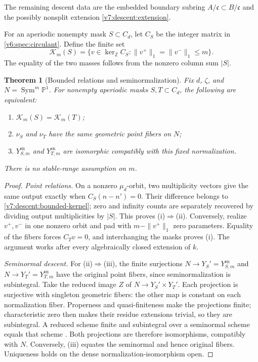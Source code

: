 \documentclass[10pt,fleqn]{article}
\numberwithin{equation}{section}
\newtheorem{theorem}{Theorem}[section]
\newcommand{\PP}{\mathbb P}
\newcommand{\sym}{\operatorname{Sym}}
\begin{document}
The remaining descent data are the embedded boundary subring
$A/\mathfrak c\subset B/\mathfrak c$ and the possibly nonsplit extension
\eqref{v7:descent:extension}.

For an aperiodic nonempty mask $S\subset C_d$, let $C_S$ be the integer
matrix in \eqref{v6:spec:circulant}.  Define the finite set
\begin{equation}\label{v7:descent:bounded-kernel}
 \mathcal K_m(S)=\{v\in\ker_{\mathbb Z}C_S:
       \|v^+\|_1=\|v^-\|_1\le m\}.
\end{equation}
The equality of the two masses follows from the nonzero column sum $|S|$.

\begin{theorem}[Bounded relations and seminormalization]
\label{v7:descent:seminormal-classification}
Fix $d$, $\zeta$, and $N=\sym^m\PP^1$.  For nonempty aperiodic masks
$S,T\subset C_d$, the following are equivalent:
\begin{enumerate}[label=\textup{(\roman*)},leftmargin=2em]
\item $\mathcal K_m(S)=\mathcal K_m(T)$;
\item $\nu_S$ and $\nu_T$ have the same geometric point fibers on $N$;
\item $Y_{S,m}^{\mathrm{sn}}$ and $Y_{T,m}^{\mathrm{sn}}$ are isomorphic
compatibly with this fixed normalization.
\end{enumerate}
There is no stable-range assumption on $m$.
\end{theorem}
\begin{proof}
\emph{Point relations.}
On a nonzero $\mu_d$-orbit, two multiplicity vectors give the same
output exactly when $C_S(n-n')=0$.  Their difference belongs to
\eqref{v7:descent:bounded-kernel}; zero and infinity counts are separately
recovered by dividing output multiplicities by $|S|$.  This proves
(i)$\Rightarrow$(ii).  Conversely, realize $v^+,v^-$ in one nonzero orbit
and pad with $m-\|v^+\|_1$ zero parameters.  Equality of the fibers forces
$C_Tv=0$, and interchanging the masks proves (i).  The argument works
after every algebraically closed extension of $k$.

\emph{Seminormal descent.}
For (ii)$\Rightarrow$(iii), the finite surjections
$N\to Y_S'=Y_{S,m}^{\mathrm{sn}}$ and $N\to Y_T'=Y_{T,m}^{\mathrm{sn}}$
have the original point fibers, since seminormalization is subintegral.
Take the reduced image $Z$ of $N\to Y_S'\times Y_T'$.
Each projection is surjective with singleton geometric fibers: the other
map is constant on each normalization fiber.  Properness and
quasi-finiteness make the projections finite; characteristic zero then
makes their residue extensions trivial, so they are subintegral.
A reduced scheme finite and subintegral
over a seminormal scheme equals that scheme \cite[Tag 0H3G]{Stacks}.
Both projections are therefore isomorphisms, compatibly with $N$.
Conversely, (iii) equates the seminormal and hence original fibers.
Uniqueness holds on the dense normalization-isomorphism open.
\end{proof}
\end{document}
